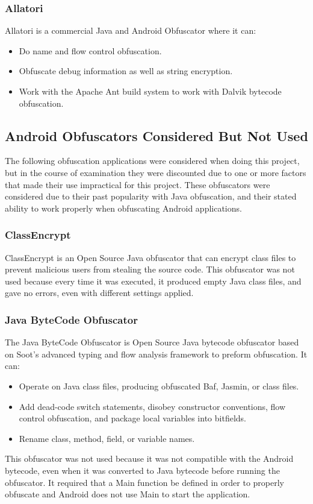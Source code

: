 \subsubsection{Allatori}
Allatori \cite{allatori} is a commercial Java and Android Obfuscator where it can:
\begin{itemize}[leftmargin=*,labelindent=1cm]
\item Do name and flow control obfuscation.
\item Obfuscate debug information as well as string encryption.
\item Work with the Apache Ant build system to work with Dalvik bytecode obfuscation.
\end{itemize}
\subsection{Android Obfuscators Considered But Not Used}
The following obfuscation applications were considered when doing this project, but in the course of examination they were discounted due to one or more factors that made their use impractical for this project. These obfuscators were considered due to their past popularity with Java obfuscation, and their stated ability to work properly when obfuscating Android applications.
\subsubsection{ClassEncrypt}
ClassEncrypt \cite{classencrypt} is an Open Source Java obfuscator that can encrypt class files to prevent malicious users from stealing the source code. This obfuscator was not used because every time it was executed, it produced empty Java class files, and gave no errors, even with different settings applied.
\subsubsection{Java ByteCode Obfuscator}
The Java ByteCode Obfuscator \cite{jbco} is Open Source Java bytecode obfuscator based on Soot's advanced typing and flow analysis framework to preform obfuscation. It can:
\begin{itemize}[leftmargin=*,labelindent=1cm]
\item Operate on Java class files, producing obfuscated Baf, Jasmin, or class files.
\item Add dead-code switch statements, disobey constructor conventions, flow control obfuscation, and package local variables into bitfields.
\item Rename class, method, field, or variable names.
\end{itemize}
This obfuscator was not used because it was not compatible with the Android bytecode, even when it was converted to Java bytecode before running the obfuscator. It required that a Main function be defined in order to properly obfuscate and Android does not use Main to start the application.
